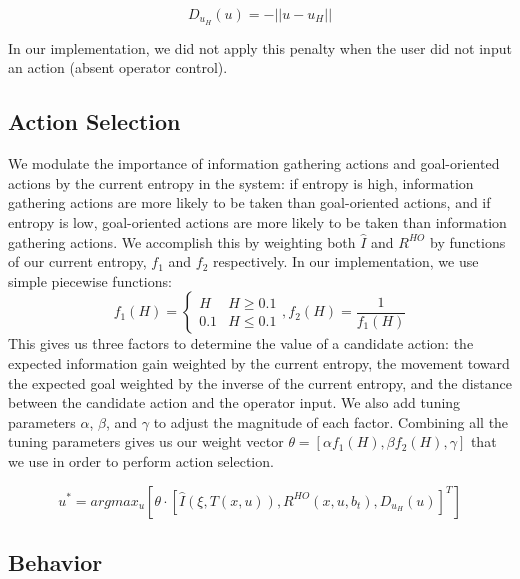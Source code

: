 \documentclass[conference]{IEEEtran}
\begin{document}
\[
D_{u_H}(u) = -||u - u_H||
\]

In our implementation, we did not apply this penalty when the user did not input an action (absent operator control).

\subsection{Action Selection}

We modulate the importance of information gathering actions and goal-oriented actions by the current entropy in the system: if entropy is high, information gathering actions are more likely to be taken than goal-oriented actions, and if entropy is low, goal-oriented actions are more likely to be taken than information gathering actions. We accomplish this by weighting both $\hat{I}$ and $R^{HO}$ by functions of our current entropy, $f_1$ and $f_2$ respectively. In our implementation, we use simple piecewise functions:
\[
f_1(H) =
\begin{cases}
H & H\geq 0.1 \\
0.1 & H\leq 0.1
\end{cases}
,f_2(H) = \frac{1}{f_1(H)}
\]
This gives us three factors to determine the value of a candidate action: the expected information gain weighted by the current entropy, the movement toward the expected goal weighted by the inverse of the current entropy, and the distance between the candidate action and the operator input. We also add tuning parameters $\alpha$, $\beta$, and $\gamma$ to adjust the magnitude of each factor. Combining all the tuning parameters gives us our weight vector $\theta = [\alpha f_1(H), \beta f_2(H), \gamma]$ that we use in order to perform action selection.

\[
u^* = argmax_u [ \theta \cdot [\hat{I}(\xi, T(x,u)), R^{HO}(x,u,b_t), D_{u_H}(u)]^T ]
\]

\subsection{Behavior}
\end{document}
